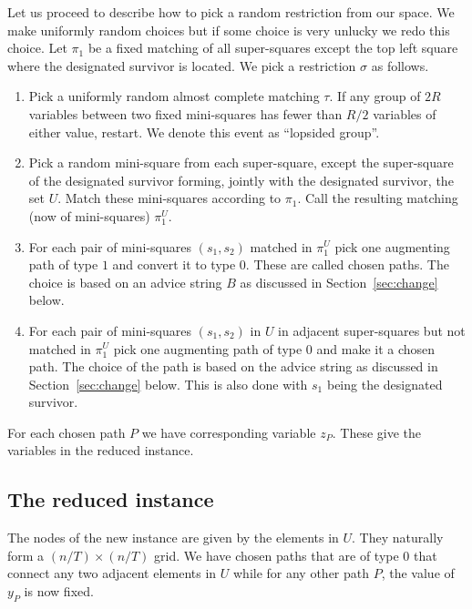 \documentclass{article}\usepackage[a4paper,margin=20mm]{geometry}
\begin{document}
Let us proceed to describe how to pick a random restriction from
our space.  We make uniformly 
random choices but if some choice is very unlucky we redo
this choice.   Let $\pi_1$ be a fixed matching of
all super-squares except the top left square where
the designated survivor is located.  We pick a restriction $\sigma$
as follows.  

\begin{enumerate}

\item Pick a uniformly random almost complete matching $\tau$.
If any group of $2R$ variables between two fixed
mini-squares has fewer than $R/2$ variables
of either value, restart.
We denote this event as ``lopsided group''.

\item Pick a random mini-square from each super-square, except
the super-square of the designated survivor forming, jointly
with the designated survivor, the set $U$.
Match these mini-squares according
to $\pi_1$.  Call the resulting matching (now of
mini-squares) $\pi_1^U$.

\item For each pair of mini-squares $(s_1,s_2)$ matched in $\pi_1^U$
pick one augmenting path of type $1$ and convert it to type $0$.
These are called chosen paths.  The choice is based on
an advice string $B$ as discussed in Section~\ref{sec:change}
below.

\item For each pair of mini-squares $(s_1,s_2)$ in $U$ in
adjacent super-squares but not matched in $\pi_1^U$
pick one augmenting path of type $0$ and make it a chosen path.
The choice of the path is based on the advice string as 
discussed in Section~\ref{sec:change} below.
This is also done with $s_1$ being the designated survivor.

\end{enumerate}

For each chosen path $P$ we have corresponding variable
$z_P$.  These give the variables in the reduced instance.

\subsection{The reduced instance}

The nodes of the new instance are given by the elements
in $U$.
They naturally form a $(n/T) \times (n/T)$ grid.
We have chosen paths that are of type $0$ that connect
any two adjacent elements in $U$ while for any other
path $P$, the value of $y_P$ is now fixed. 
\end{document}
